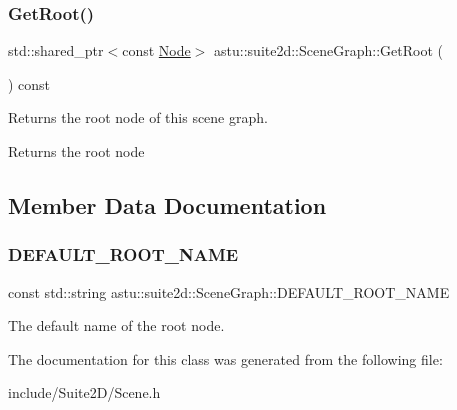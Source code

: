 \subsubsection{\texorpdfstring{Get\+Root()}{GetRoot()}\hspace{0.1cm}{\footnotesize\ttfamily [2/2]}}
{\footnotesize\ttfamily std\+::shared\+\_\+ptr$<$const \hyperlink{classastu_1_1suite2d_1_1Node}{Node}$>$ astu\+::suite2d\+::\+Scene\+Graph\+::\+Get\+Root (\begin{DoxyParamCaption}{ }\end{DoxyParamCaption}) const\hspace{0.3cm}{\ttfamily [inline]}}

Returns the root node of this scene graph.

\begin{DoxyReturn}{Returns}
the root node 
\end{DoxyReturn}


\subsection{Member Data Documentation}
\mbox{\label{classastu_1_1suite2d_1_1SceneGraph_aeecb669e9f201f03728ee6184df533f8}} 
\subsubsection{\texorpdfstring{D\+E\+F\+A\+U\+L\+T\+\_\+\+R\+O\+O\+T\+\_\+\+N\+A\+ME}{DEFAULT\_ROOT\_NAME}}
{\footnotesize\ttfamily const std\+::string astu\+::suite2d\+::\+Scene\+Graph\+::\+D\+E\+F\+A\+U\+L\+T\+\_\+\+R\+O\+O\+T\+\_\+\+N\+A\+ME\hspace{0.3cm}{\ttfamily [static]}}

The default name of the root node. 

The documentation for this class was generated from the following file\+:\begin{DoxyCompactItemize}
\item 
include/\+Suite2\+D/Scene.\+h\end{DoxyCompactItemize}
